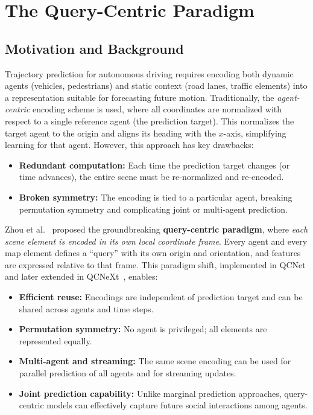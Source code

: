 \chapter{The Query-Centric Paradigm}
\label{chap:query_centric_paradigm}

\section{Motivation and Background}
Trajectory prediction for autonomous driving requires encoding both dynamic agents (vehicles, pedestrians) and static context (road lanes, traffic elements) into a representation suitable for forecasting future motion. Traditionally, the \emph{agent-centric} encoding scheme is used, where all coordinates are normalized with respect to a single reference agent (the prediction target). This normalizes the target agent to the origin and aligns its heading with the $x$-axis, simplifying learning for that agent. However, this approach has key drawbacks:
\begin{itemize}
    \item \textbf{Redundant computation:} Each time the prediction target changes (or time advances), the entire scene must be re-normalized and re-encoded.
    \item \textbf{Broken symmetry:} The encoding is tied to a particular agent, breaking permutation symmetry and complicating joint or multi-agent prediction.
\end{itemize}

Zhou et al.~\cite{Zhou2023QueryCentric} proposed the groundbreaking \textbf{query-centric paradigm}, where \emph{each scene element is encoded in its own local coordinate frame}. Every agent and every map element defines a ``query'' with its own origin and orientation, and features are expressed relative to that frame. This paradigm shift, implemented in QCNet and later extended in QCNeXt~\cite{qcnextZhou2023}, enables:
\begin{itemize}
    \item \textbf{Efficient reuse:} Encodings are independent of prediction target and can be shared across agents and time steps.
    \item \textbf{Permutation symmetry:} No agent is privileged; all elements are represented equally.
    \item \textbf{Multi-agent and streaming:} The same scene encoding can be used for parallel prediction of all agents and for streaming updates.
    \item \textbf{Joint prediction capability:} Unlike marginal prediction approaches, query-centric models can effectively capture future social interactions among agents.
\end{itemize}

